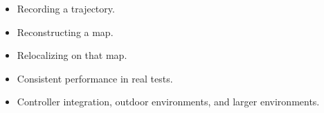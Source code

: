 \transfade[duration=0.25]
\vspace{-0.08cm}
\begin{outlinecard}[Findings]
  \small
  \begin{itemize}
    \item<1-> Recording a trajectory.
    \item<2-> Reconstructing a map.
    \item<3-> Relocalizing on that map.
    \item<4-> Consistent performance in real tests.
  \end{itemize}
\end{outlinecard}

\vspace{-0.05cm}
\begin{outlinecard}
  \small
  \begin{itemize}
    \item<5-> Controller integration, outdoor environments, and larger environments.
  \end{itemize}
\end{outlinecard}
